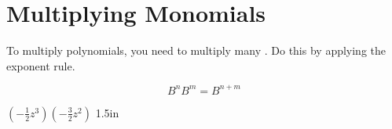 \section{Multiplying Monomials}

To multiply polynomials, 
you need to multiply many .
Do this by applying the   exponent rule.
\begin{tcolorbox}[center,width=2.5in]
    \Large\vspace{-1.2\onelineskip}
    \[
        B^n B^m = B^{n+m}
    \]
\end{tcolorbox}


    {
        $ \left(-\frac{1}{2}z^3\right) \left(-\frac{3}{2}z^2\right) $
    }
    {1.5in}


